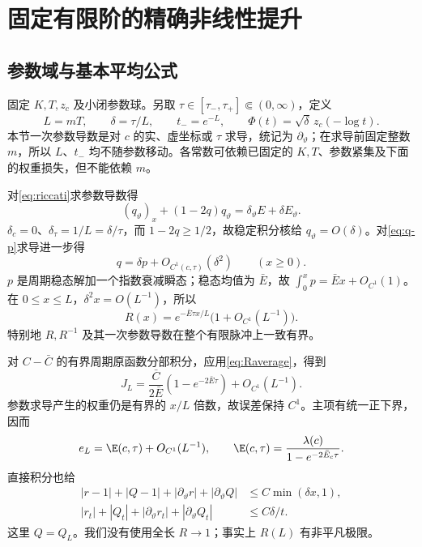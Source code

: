 \section{固定有限阶的精确非线性提升}\label{sec:lift}
\subsection{参数域与基本平均公式}
固定 $K,T,z_c$ 及小闭参数球。另取 $\tau\in[\tau_-,\tau_+]\Subset(0,\infty)$，定义
\begin{equation}\label{eq:scales}
L=mT,\qquad\delta=\tau/L,\qquad t_-=e^{-L},\qquad
\Phi(t)=\sqrt\delta\,z_c(-\log t).
\end{equation}
本节一次参数导数是对 $c$ 的实、虚坐标或 $\tau$ 求导，统记为 $\partial_\vartheta$；在求导前固定整数 $m$，所以 $L$、$t_-$ 均不随参数移动。各常数可依赖已固定的 $K,T$、参数紧集及下面的权重损失，但不能依赖 $m$。

对\eqref{eq:riccati}求参数导数得
\begin{equation}\label{eq:qparameter}
(q_\vartheta)_x+(1-2q)q_\vartheta
=\delta_\vartheta E+\delta E_\vartheta.
\end{equation}
$\delta_c=0$、$\delta_\tau=1/L=\delta/\tau$，而 $1-2q\ge1/2$，故稳定积分核给 $q_\vartheta=O(\delta)$。对\eqref{eq:q-p}求导进一步得
\begin{equation}\label{eq:qp-C1}
q=\delta p+O_{C^1(c,\tau)}(\delta^2)\qquad(x\ge0).
\end{equation}
$p$ 是周期稳态解加一个指数衰减瞬态；稳态均值为 $\bar E$，故 $\int_0^xp=\bar E x+O_{C^1}(1)$。在 $0\le x\le L$，$\delta^2x=O(L^{-1})$，所以
\begin{equation}\label{eq:Raverage}
R(x)=e^{-\bar E\tau x/L}\bigl(1+O_{C^1}(L^{-1})\bigr).
\end{equation}
特别地 $R,R^{-1}$ 及其一次参数导数在整个有限脉冲上一致有界。

对 $C-\bar C$ 的有界周期原函数分部积分，应用\eqref{eq:Raverage}，得到
\begin{equation}\label{eq:JLaverage}
J_L=\frac{\bar C}{2\bar E}(1-e^{-2\bar E\tau})+O_{C^1}(L^{-1}).
\end{equation}
参数求导产生的权重仍是有界的 $x/L$ 倍数，故误差保持 $C^1$。主项有统一正下界，因而
\begin{equation}\label{eq:Ecal}
e_L=\E(c,\tau)+O_{C^1}(L^{-1}),\qquad
\E(c,\tau)=\frac{\lambda(c)}{1-e^{-2\bar E_c\tau}}.
\end{equation}
直接积分也给
\begin{align}
|r-1|+|Q-1|+|\partial_\vartheta r|+|\partial_\vartheta Q|
&\le C\min(\delta x,1),\label{eq:base-difference}\\
|r_t|+|Q_t|+|\partial_\vartheta r_t|+|\partial_\vartheta Q_t|
&\le C\delta/t.\label{eq:base-derivative}
\end{align}
这里 $Q=Q_L$。我们没有使用全长 $R\to1$；事实上 $R(L)$ 有非平凡极限。

